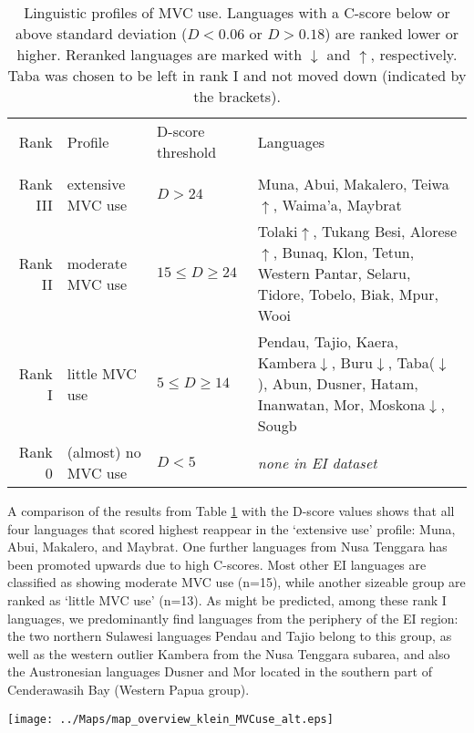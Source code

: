 \begin{table}


\begin{tabular}{r l l p{5cm} }
\hline\hline
Rank & Profile & D-score threshold & Languages \\
 \\ 
\hline
 Rank III & extensive MVC use & $D > 24 $ & Muna, Abui, Makalero, Teiwa$\uparrow$, Waima'a, Maybrat \\ 
\hline 
Rank II & moderate MVC use & $  15 \leq D \geq 24 $ & Tolaki$\uparrow$, Tukang Besi, Alorese$\uparrow$, Bunaq, Klon, Tetun, Western Pantar, Selaru, Tidore, Tobelo, Biak, Mpur, Wooi \\
\hline
Rank I & little MVC use & $ 5 \leq D \geq 14 $  & Pendau, Tajio, Kaera, Kambera$\downarrow$, Buru$\downarrow$, Taba($\downarrow$), Abun, Dusner, Hatam, Inanwatan, Mor, Moskona$\downarrow$, Sougb \\
\hline 
Rank 0 & (almost) no MVC use & $ D < 5 $ & \textit{none in EI dataset} \\    
\hline 
\end{tabular}
\caption[Linguistic profiles of MVC use]{Linguistic profiles of MVC use. Languages with a C-score below or above standard deviation ($D < 0.06$ or $D > 0.18$) are ranked lower or higher. Reranked languages are marked with $\downarrow$ and $\uparrow$, respectively. Taba was chosen to be left in rank I and not moved down (indicated by the brackets).}
\label{table:profile_MVCuse} 


\end{table}


A comparison of the results from Table \ref{table:profile_MVCuse} with the D-score values shows that all four languages that scored highest reappear in the `extensive use' profile: Muna, Abui, Makalero, and Maybrat. One further languages from Nusa Tenggara has been promoted upwards due to high C-scores. Most other EI languages are classified as showing moderate MVC use (n=15), while another sizeable group are ranked as `little MVC use' (n=13). As might be predicted, among these rank I languages, we predominantly find languages from the periphery of the EI region: the two northern Sulawesi languages Pendau and Tajio belong to this group, as well as the western outlier Kambera from the Nusa Tenggara subarea, and also the Austronesian languages Dusner and Mor located in the southern part of Cenderawasih Bay (Western Papua group). 

\begin{sidewaysfigure}
\texttt{[image: ../Maps/map\_overview\_klein\_MVCuse\_alt.eps]}
\caption[Geographical distribution of linguistic profiles of MVC use across Eastern Indonesia]{Geographical distribution of linguistic profiles of MVC use across Eastern Indonesia. Languages are grouped into Austronesian (circles) and Papuan (squares). The colours designate the four linguistic profiles from Table \ref{table:profile_MVCuse}. Two Sulawesi languages, Totoli and Makassarese, have been added as outgroup examples, and are good candidates for the rank 0 profile. Potential core areas of MVC use are highlighted by dotted outlines.}\label{fig:map_profiles}
\end{sidewaysfigure}

